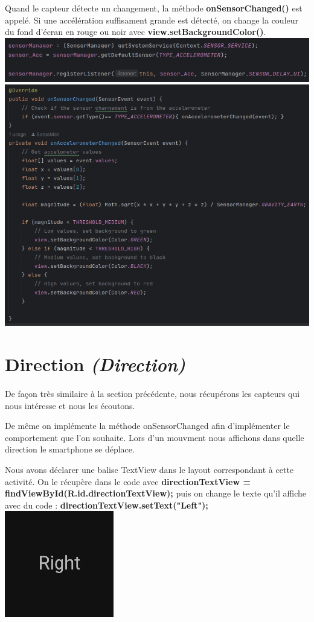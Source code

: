 \documentclass[a4paper]{article}
\begin{document}
\begin{multicols}{2}
                Quand le capteur détecte un changement, la méthode \textbf{onSensorChanged()} est appelé. Si une accélération suffisament grande est détecté, on change la couleur du fond d'écran en rouge ou noir avec \textbf{view.setBackgroundColor()}.
                \includegraphics[width=.49\textwidth]{accelerometre/register}
                \includegraphics[width=.49\textwidth]{accelerometre/onSensorChanged}
        \section{Direction \emph{(Direction)}}
            \paragraph{}
                De façon très similaire à la section précédente, nous récupérons les capteurs qui nous intéresse et nous les écoutons.

                De même on implémente la méthode onSensorChanged afin d'implémenter le comportement que l'on souhaite. Lors d'un mouvment nous affichons dans quelle direction le smartphone se déplace. 
                
                Nous avons déclarer une balise TextView dans le layout correspondant à cette activité. On le récupère dans le code avec \textbf{directionTextView = findViewById(R.id.directionTextView);} puis on change le texte qu'il affiche avec du code : \textbf{directionTextView.setText("Left");}
                \includegraphics[width=.49\textwidth]{direction/screenshot}

\end{multicols}
\end{document}
